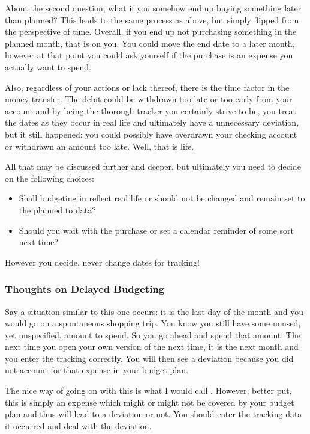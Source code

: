 About the second question, what if you somehow end up buying something later than planned?
This leads to the same process as above, but simply flipped from the perspective of time.
Overall, if you end up not purchasing something in the planned month, that is on you.
You could move the end date to a later month, however at that point you could ask yourself if the purchase is an expense you actually want to spend.

Also, regardless of your actions or lack thereof, there is the time factor in the money transfer.
The debit could be withdrawn too late or too early from your account and by being the thorough tracker you certainly strive to be, you treat the dates as they occur in real life and ultimately have a unnecessary deviation, but it still happened: you could possibly have overdrawn your checking account or withdrawn an amount too late.
Well, that is life.

All that may be discussed further and deeper, but ultimately you need to decide on the following choices:
\begin{itemize}
	\item Shall budgeting in \tfn reflect real life or should \tfn not be changed and remain set to the planned to data?
	\item Should you wait with the purchase or set a calendar reminder of some sort next time?
\end{itemize}
\begin{specialnote}
	However you decide, never change dates for tracking!
\end{specialnote}

\subsubsection{Thoughts on Delayed Budgeting}
\label{subsubsec:thoughts-delayed-budgeting}

Say a situation similar to this one occurs:
it is the last day of the month and you would go on a spontaneous shopping trip.
You know you still have some unused, yet unspecified, amount to spend.
So you go ahead and spend that amount.
The next time you open your own version of \tfn the next time, it is the next month and you enter the tracking correctly.
You will then see a deviation because you did not account for that expense in your budget plan.

The nice way of going on with this is what I would call .
However, better put, this is simply an expense which might or might not be covered by your budget plan and thus will lead to a deviation or not.
You should enter the tracking data it occurred and deal with the deviation.

